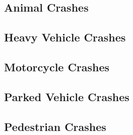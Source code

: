 \documentclass[11pt, a4paper]{article}
\begin{document}
\pagebreak
\subsection{Animal Crashes}




\pagebreak
\subsection{Heavy Vehicle Crashes}




\pagebreak
\subsection{Motorcycle Crashes}




\pagebreak
\subsection{Parked Vehicle Crashes}





\pagebreak
\subsection{Pedestrian Crashes}











\pagebreak
\section{}
\end{document}
